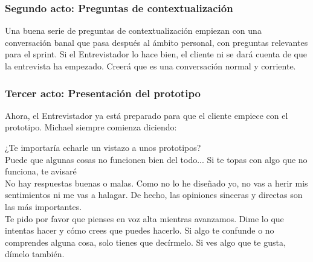 \documentclass[10pt]{article}
\begin{document}
\begin{multicols}{2}
\subsubsection*{Segundo acto: Preguntas de contextualización}
Una buena serie de preguntas de contextualización empiezan con una conversación banal que pasa después al ámbito personal, con preguntas relevantes para el sprint. Si el Entrevistador lo hace bien, el cliente ni se dará cuenta de que la entrevista ha empezado. Creerá que es una conversación normal y corriente.
\subsubsection*{Tercer acto: Presentación del prototipo}
Ahora, el Entrevistador ya está preparado para que el cliente empiece con el prototipo. Michael siempre comienza diciendo:
\begin{center}
¿Te importaría echarle un vistazo a unos prototipos?\\
Puede que algunas cosas no funcionen bien del todo... Si te topas con algo que no funciona, te avisaré\\
No hay respuestas buenas o malas. Como no lo he diseñado yo, no vas a herir mis sentimientos ni me vas a halagar. De hecho, las opiniones sinceras y directas son las más importantes.\\
Te pido por favor que pienses en voz alta mientras avanzamos. Dime lo que intentas hacer y cómo crees que puedes hacerlo. Si algo te confunde o no comprendes alguna cosa, solo tienes que decírmelo. Si ves algo que te gusta, dímelo también.
\end{center}

\end{multicols}
\end{document}
